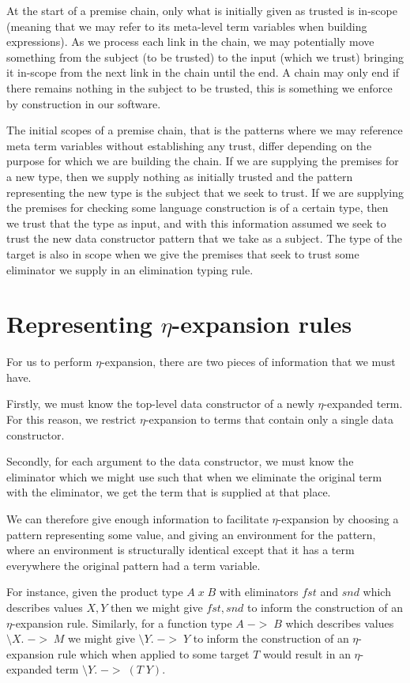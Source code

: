 At the start of a premise chain, only what is initially given as
trusted is in-scope (meaning that we may refer to its meta-level term
variables when building expressions). As we process each link in the
chain, we may potentially move something from the subject (to be
trusted) to the input (which we trust) bringing it in-scope from the
next link in the chain until the end. A chain may only end if there
remains nothing in the subject to be trusted, this is something we
enforce by construction in our software.

The initial scopes of a premise chain, that is the patterns where we
may reference meta term variables without establishing any trust,
differ depending on the purpose for which we are building the
chain. If we are supplying the premises for a new type, then we supply
nothing as initially trusted and the pattern representing the new type
is the subject that we seek to trust. If we are supplying the premises
for checking some language construction is of a certain type, then we
trust that the type as input, and with this information assumed we
seek to trust the new data constructor pattern that we take as a
subject. The type of the target is also in scope when we give the
premises that seek to trust some eliminator we supply in an
elimination typing rule.

\section{Representing $\eta$-expansion rules}
\label{DSL-eta-rules}

For us to perform $\eta$-expansion, there are two pieces of
information that we must have.

Firstly, we must know the top-level data constructor of a newly
$\eta$-expanded term. For this reason, we restrict $\eta$-expansion to
terms that contain only a single data constructor.

Secondly, for each argument to the data constructor, we must know the
eliminator which we might use such that when we eliminate the original
term with the eliminator, we get the term that is supplied at that
place. 

We can therefore give enough information to facilitate
$\eta$-expansion by choosing a pattern representing some value, and
giving an environment for the pattern, where an environment is
structurally identical except that it has a term everywhere the
original pattern had a term variable.

For instance, given the product type $A \; x \; B$ with eliminators
$fst$ and $snd$ which describes values $X , Y$ then we might give $fst
, snd$ to inform the construction of an $\eta$-expansion rule. Similarly,
for a function type $A \; -> \; B$ which describes values $\setminus
X. \; -> \; M$  we might give $\setminus Y. \; -> \; Y$ to inform the
construction of an $\eta$-expansion rule which when applied to some
target $T$ would result in an $\eta$-expanded term
$\setminus Y. \; -> \; (T \; Y)$.

